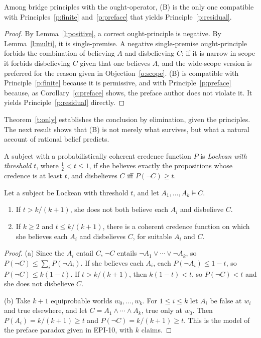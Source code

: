 \documentclass{situationist-preprint}
\begin{document}
\begin{theorem}\label{t:only}
Among bridge principles with the ought-operator, (B) is the only one compatible with Principles~\ref{p:finite} and~\ref{p:preface} that yields Principle~\ref{p:residual}.
\end{theorem}

\begin{proof}
By Lemma~\ref{l:positive}, a correct ought-principle is negative. By Lemma~\ref{l:multi}, it is single-premise. A negative single-premise ought-principle forbids the combination of believing $A$ and disbelieving $C$; if it is narrow in scope it forbids disbelieving $C$ given that one believes $A$, and the wide-scope version is preferred for the reason given in Objection~\ref{o:scope}. (B) is compatible with Principle~\ref{p:finite} because it is permissive, and with Principle~\ref{p:preface} because, as Corollary~\ref{c:preface} shows, the preface author does not violate it. It yields Principle~\ref{p:residual} directly.
\end{proof}

Theorem~\ref{t:only} establishes the conclusion by elimination, given the principles. The next result shows that (B) is not merely what survives, but what a natural account of rational belief predicts.

\begin{definition}\label{d:lockean}
A subject with a probabilistically coherent credence function $P$ is \emph{Lockean with threshold $t$}, where $\tfrac12 < t \leq 1$, if she believes exactly the propositions whose credence is at least $t$, and disbelieves $C$ iff $P(\neg C) \geq t$.
\end{definition}

\begin{proposition}\label{p:threshold}
Let a subject be Lockean with threshold $t$, and let $A_1, \ldots, A_k \models C$.
\begin{enumerate}[label=(\alph*)]
\item If $t > k/(k+1)$, she does not both believe each $A_i$ and disbelieve $C$.
\item If $k \geq 2$ and $t \leq k/(k+1)$, there is a coherent credence function on which she believes each $A_i$ and disbelieves $C$, for suitable $A_i$ and $C$.
\end{enumerate}
\end{proposition}

\begin{proof}
(a) Since the $A_i$ entail $C$, $\neg C$ entails $\neg A_1 \vee \cdots \vee \neg A_k$, so $P(\neg C) \leq \sum_i P(\neg A_i)$. If she believes each $A_i$, each $P(\neg A_i) \leq 1 - t$, so $P(\neg C) \leq k(1-t)$. If $t > k/(k+1)$, then $k(1-t) < t$, so $P(\neg C) < t$ and she does not disbelieve $C$.

(b) Take $k+1$ equiprobable worlds $w_0, \ldots, w_k$. For $1 \leq i \leq k$ let $A_i$ be false at $w_i$ and true elsewhere, and let $C = A_1 \wedge \cdots \wedge A_k$, true only at $w_0$. Then $P(A_i) = k/(k+1) \geq t$ and $P(\neg C) = k/(k+1) \geq t$. This is the model of the preface paradox given in EPI-10, with $k$ claims.
\end{proof}
\end{document}
